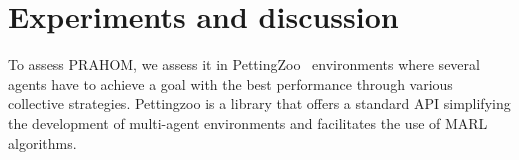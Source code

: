\documentclass[doubleblind]{ecai}
\begin{document}
\section{Experiments and discussion}




To assess PRAHOM, we assess it in PettingZoo~\citep{Terry2021} environments where several agents have to achieve a goal with the best performance through various collective strategies. Pettingzoo is a library that offers a standard API simplifying the development of multi-agent environments and facilitates the use of MARL algorithms.
\end{document}
